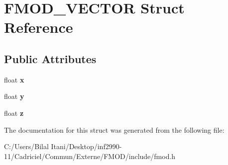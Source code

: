 \hypertarget{struct_f_m_o_d___v_e_c_t_o_r}{}\section{F\+M\+O\+D\+\_\+\+V\+E\+C\+T\+OR Struct Reference}
\label{struct_f_m_o_d___v_e_c_t_o_r}
\subsection*{Public Attributes}
\begin{DoxyCompactItemize}
\item 
float {\bfseries x}\hypertarget{struct_f_m_o_d___v_e_c_t_o_r_afe9fad8ce812c3cfc021c25bbb8bc0e8}{}\label{struct_f_m_o_d___v_e_c_t_o_r_afe9fad8ce812c3cfc021c25bbb8bc0e8}

\item 
float {\bfseries y}\hypertarget{struct_f_m_o_d___v_e_c_t_o_r_abea7feb26ece298baa766f821b8686ff}{}\label{struct_f_m_o_d___v_e_c_t_o_r_abea7feb26ece298baa766f821b8686ff}

\item 
float {\bfseries z}\hypertarget{struct_f_m_o_d___v_e_c_t_o_r_ab64088b1bd2e695bd1abc6b370b71796}{}\label{struct_f_m_o_d___v_e_c_t_o_r_ab64088b1bd2e695bd1abc6b370b71796}

\end{DoxyCompactItemize}


The documentation for this struct was generated from the following file\+:\begin{DoxyCompactItemize}
\item 
C\+:/\+Users/\+Bilal Itani/\+Desktop/inf2990-\/11/\+Cadriciel/\+Commun/\+Externe/\+F\+M\+O\+D/include/fmod.\+h\end{DoxyCompactItemize}
